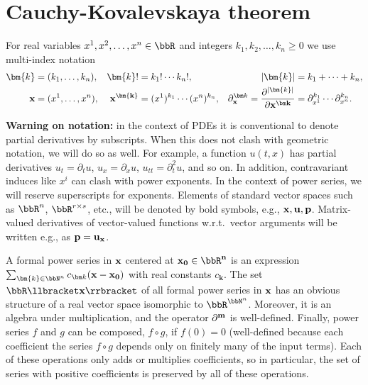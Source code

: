 \section{Cauchy-Kovalevskaya theorem}


For real variables $x^1,x^2,\ldots,x^n\in\bbR$ and integers $k_1,k_2,\ldots,k_n\geq 0$ we use multi-index notation 
\begin{align}
    \bm{k}&=(k_1,\ldots,k_n), &\bm{k}!&=k_1!\cdots k_n!,&  |\bm{k}|&=k_1+\cdots+k_n,\\
    \bf{x}&=(x^1,\ldots,x^n), &\bf{x}^{\bm{k}}&=(x^1)^{k_1}\cdots (x^n)^{k_n},& \partial^{\bm k}_{\bf x}=\frac{\partial^{|\bm{k}|}}{\partial\bf{x}^{\bm k}}&=\partial^{k_1}_{x^1}\cdots \partial^{k_n}_{x^n}.
\end{align}

\textbf{Warning on notation:} in the context of PDEs it is conventional to denote partial derivatives by subscripts. When this does not clash with geometric notation, we will do so as well. For example, a function $u(t,x)$ has partial derivatives $u_t=\partial_t u$, $u_{x}=\partial_x u$, $u_{tt}=\partial_t^2 u$, and so on. In addition, contravariant induces like $x^i$ can clash with power exponents. In the context of power series, we will reserve superscripts for exponents. Elements of standard vector spaces such as $\bbR^n$, $\bbR^{r\times s}$, etc., will be denoted by bold symbols, e.g., $\bf{x},\bf{u},\bf{p}$. Matrix-valued derivatives of vector-valued functions w.r.t.\ vector arguments will be written e.g., as $\bf{p}=\bf{u}_{\bf{x}}$.

\begin{defn}
    A formal power series in $\bf{x}$ centered at $\bf{x}_0\in\bbR^n$ is an expression $\sum_{\bm{k}\in\bbN^n}c_{\bm k}(\bf{x}-\bf{x}_0)$ with real constants $c_{\bm k}$. The set $\bbR\llbracket\bf{x}\rrbracket$ of all formal power series in $\bf{x}$ has an obvious structure of a real vector space isomorphic to $\bbR^{\bbN^n}$. Moreover, it is an algebra under multiplication, and the operator $\partial^{\bf{m}}$ is well-defined. Finally, power series $f$ and $g$ can be composed, $f\circ g$, if $f(0)=0$ (well-defined because each coefficient the series $f\circ g$ depends only on finitely many of the input terms). Each of these operations only adds or multiplies coefficients, so in particular, the set of series with positive coefficients is preserved by all of these operations.
\end{defn}

